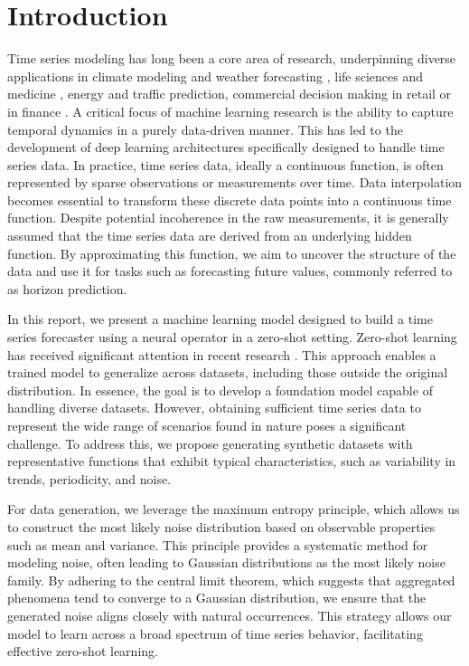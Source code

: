 \documentclass{article}
\theoremstyle{plain}
\theoremstyle{definition}
\theoremstyle{remark}
\begin{document}
\section{Introduction}
Time series modeling has long been a core area of research, underpinning diverse applications in climate modeling and weather forecasting \cite{climate}, life sciences \cite{li} and medicine  \cite{medicine}, energy and traffic prediction,  commercial decision making in retail  \cite{retail} or in finance \cite{finance}. A critical focus of machine learning research is the ability to capture temporal dynamics in a purely data-driven manner. This has led to the development of deep learning architectures specifically designed to handle time series data. In practice, time series data, ideally a continuous function, is often represented by sparse observations or measurements over time. Data interpolation becomes essential to transform these discrete data points into a continuous time function. Despite potential incoherence in the raw measurements, it is generally assumed that the time series data are derived from an underlying hidden function. By approximating this function, we aim to uncover the structure of the data and use it for tasks such as forecasting future values, commonly referred to as horizon prediction.

In this report, we present a machine learning model designed to build a time series forecaster using a neural operator in a zero-shot setting. Zero-shot learning has received significant attention in recent research \cite{das2024decoderonlyfoundationmodeltimeseries}. This approach enables a trained model to generalize across datasets, including those outside the original distribution. In essence, the goal is to develop a foundation model capable of handling diverse datasets. However, obtaining sufficient time series data to represent the wide range of scenarios found in nature poses a significant challenge. To address this, we propose generating synthetic datasets with representative functions that exhibit typical characteristics, such as variability in trends, periodicity, and noise.

For data generation, we leverage the maximum entropy principle, which allows us to construct the most likely noise distribution based on observable properties such as mean and variance. This principle provides a systematic method for modeling noise, often leading to Gaussian distributions as the most likely noise family. By adhering to the central limit theorem, which suggests that aggregated phenomena tend to converge to a Gaussian distribution, we ensure that the generated noise aligns closely with natural occurrences. This strategy allows our model to learn across a broad spectrum of time series behavior, facilitating effective zero-shot learning.
\end{document}
